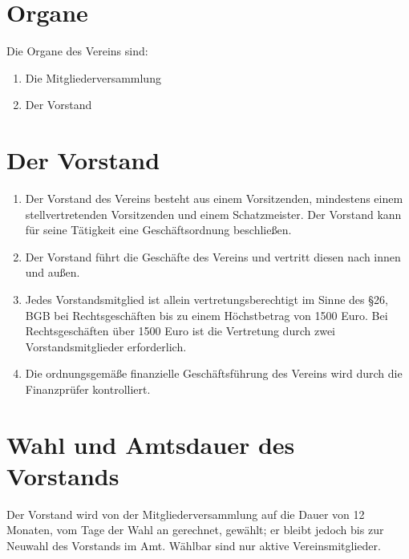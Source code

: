 \chapter{Organe}

Die Organe des Vereins sind:
\begin{enumerate}
	\item Die Mitgliederversammlung
	\item Der Vorstand
\end{enumerate}

\chapter{Der Vorstand}
\begin{enumerate}
	\item Der Vorstand des Vereins besteht aus einem Vorsitzenden, mindestens einem stellvertretenden Vorsitzenden und einem Schatzmeister. Der Vorstand kann für seine Tätigkeit eine Geschäftsordnung beschließen.
	\item Der Vorstand führt die Geschäfte des Vereins und vertritt diesen nach innen und außen.
	\item Jedes Vorstandsmitglied ist allein vertretungsberechtigt im Sinne des §26, BGB bei Rechtsgeschäften bis zu einem Höchstbetrag von 1500 Euro. Bei Rechtsgeschäften über 1500 Euro ist die Vertretung durch zwei Vorstandsmitglieder erforderlich.
	\item Die ordnungsgemäße finanzielle Geschäftsführung des Vereins wird durch die Finanzprüfer kontrolliert.
\end{enumerate}

\chapter{Wahl und Amtsdauer des Vorstands}
Der Vorstand wird von der Mitgliederversammlung auf die Dauer von 12 Monaten, vom Tage der Wahl an gerechnet, gewählt; er bleibt jedoch bis zur Neuwahl des Vorstands im Amt. Wählbar sind nur aktive Vereinsmitglieder.

